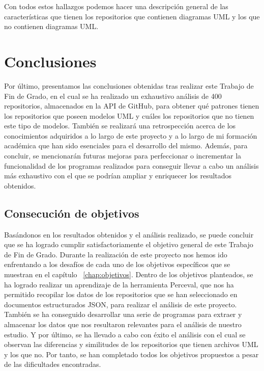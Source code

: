 \documentclass[a4paper, 12pt]{book}
\begin{document}
Con todos estos hallazgos podemos hacer una descripción general de las características que tienen los repositorios que contienen diagramas UML y los que no contienen diagramas UML.


\cleardoublepage
\chapter{Conclusiones}
\label{chap:conclusiones}

Por último, presentamos las conclusiones obtenidas tras realizar este Trabajo de Fin de Grado, en el cual se ha realizado un exhaustivo análisis de 400 repositorios, almacenados en la API de GitHub, para obtener qué patrones tienen los repositorios que poseen modelos UML y cuáles los repositorios que no tienen este tipo de modelos. 
También se realizará una retrospección acerca de los conocimientos adquiridos a lo largo de este proyecto y a lo largo de mi formación académica que han sido esenciales para el desarrollo del mismo.
Además, para concluir, se mencionarán futuras mejoras para perfeccionar o incrementar la funcionalidad de los programas realizados para conseguir llevar a cabo un análisis más exhaustivo con el que se podrían ampliar y enriquecer los resultados obtenidos.


\section{Consecución de objetivos}
\label{sec:consecucion-objetivos}

Basándonos en los resultados obtenidos y el análisis realizado, se puede concluir que se ha logrado cumplir satisfactoriamente el objetivo general de este Trabajo de Fin de Grado.
Durante la realización de este proyecto nos hemos ido enfrentando a los desafíos de cada uno de los objetivos específicos que se muestran en el capítulo ~\ref{chap:objetivos}.
Dentro de los objetivos planteados, se ha logrado realizar un aprendizaje de la herramienta Perceval, que nos ha permitido recopilar los datos de los repositorios que se han seleccionado en documentos estructurados JSON, para realizar el análisis de este proyecto. 
También se ha conseguido desarrollar una serie de programas para extraer y almacenar los datos que nos resultaron relevantes para el análisis de nuestro estudio.
Y por último, se ha llevado a cabo con éxito el análisis con el cual se observan las diferencias y similitudes de los repositorios que tienen archivos UML y los que no.
Por tanto, se han completado todos los objetivos propuestos a pesar de las dificultades encontradas.
\end{document}
